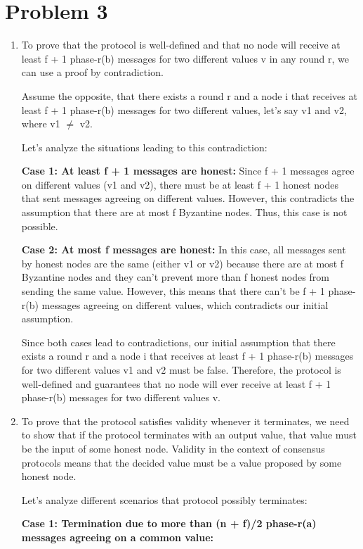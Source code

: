 \documentclass{article}
\begin{document}
\section*{Problem 3}


\begin{enumerate}
\item %
To prove that the protocol is well-defined and that no node will receive at least f + 1 phase-r(b) messages for two different values v in any round r, we can use a proof by contradiction.

Assume the opposite, that there exists a round r and a node i that receives at least f + 1 phase-r(b) messages for two different values, let's say v1 and v2, where v1 $≠$ v2.

Let's analyze the situations leading to this contradiction:

\textbf{Case 1: At least f + 1 messages are honest:} Since f + 1 messages agree on different values (v1 and v2), there must be at least f + 1 honest nodes that sent messages agreeing on different values. However, this contradicts the assumption that there are at most f Byzantine nodes. Thus, this case is not possible.

\textbf{Case 2: At most f messages are honest:} In this case, all messages sent by honest nodes are the same (either v1 or v2) because there are at most f Byzantine nodes and they can't prevent more than f honest nodes from sending the same value. However, this means that there can't be f + 1 phase-r(b) messages agreeing on different values, which contradicts our initial assumption.

Since both cases lead to contradictions, our initial assumption that there exists a round r and a node i that receives at least f + 1 phase-r(b) messages for two different values v1 and v2 must be false. Therefore, the protocol is well-defined and guarantees that no node will ever receive at least f + 1 phase-r(b) messages for two different values v.

\item %
    To prove that the protocol satisfies validity whenever it terminates, we need to show that if the protocol terminates with an output value, that value must be the input of some honest node. Validity in the context of consensus protocols means that the decided value must be a value proposed by some honest node.

Let's analyze different scenarios that protocol possibly terminates:

\textbf{Case 1: Termination due to more than (n + f)/2 phase-r(a) messages agreeing on a common value:}


\end{enumerate}
\end{document}
